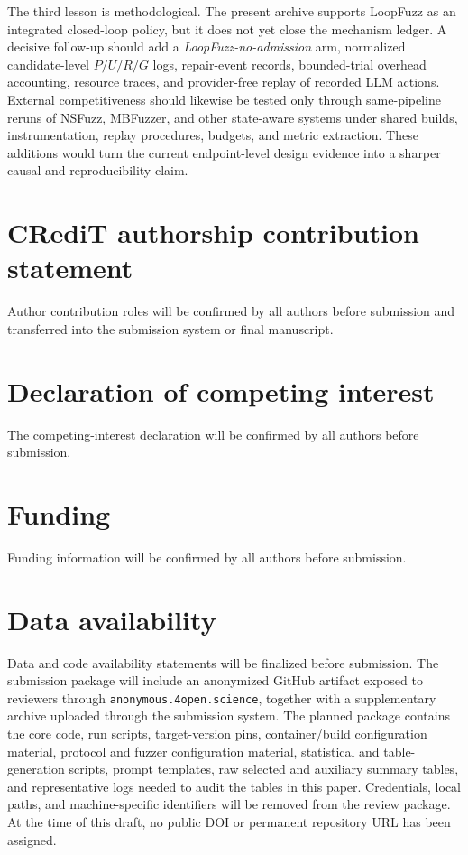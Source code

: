 \documentclass[final,5p,times,number]{elsarticle}
\begin{document}
The third lesson is methodological. The present archive supports LoopFuzz as an integrated closed-loop policy, but it does not yet close the mechanism ledger. A decisive follow-up should add a \emph{LoopFuzz-no-admission} arm, normalized candidate-level $P/U/R/G$ logs, repair-event records, bounded-trial overhead accounting, resource traces, and provider-free replay of recorded LLM actions. External competitiveness should likewise be tested only through same-pipeline reruns of NSFuzz, MBFuzzer, and other state-aware systems under shared builds, instrumentation, replay procedures, budgets, and metric extraction. These additions would turn the current endpoint-level design evidence into a sharper causal and reproducibility claim.

\section*{CRediT authorship contribution statement}
Author contribution roles will be confirmed by all authors before submission and transferred into the submission system or final manuscript.

\section*{Declaration of competing interest}
The competing-interest declaration will be confirmed by all authors before submission.

\section*{Funding}
Funding information will be confirmed by all authors before submission.

\section*{Data availability}
Data and code availability statements will be finalized before submission. The submission package will include an anonymized GitHub artifact exposed to reviewers through \texttt{anonymous.4open.science}, together with a supplementary archive uploaded through the submission system. The planned package contains the core code, run scripts, target-version pins, container/build configuration material, protocol and fuzzer configuration material, statistical and table-generation scripts, prompt templates, raw selected and auxiliary summary tables, and representative logs needed to audit the tables in this paper. Credentials, local paths, and machine-specific identifiers will be removed from the review package. At the time of this draft, no public DOI or permanent repository URL has been assigned.
\end{document}
